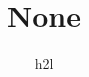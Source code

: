 \documentclass[]{article}
\title{None}
\author{h2l}
\begin{document}
\maketitle
\begin{abstract}

\end{abstract}

\section{}
\end{document}

